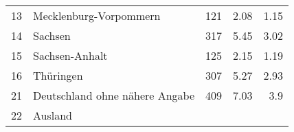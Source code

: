 \begin{longtable}{lXrrr}
     13 &
     \multicolumn{1}{X}{ Mecklenburg-Vorpommern   } &


       \num{121} &
       \num[round-mode=places,round-precision=2]{2,08} &
         \num[round-mode=places,round-precision=2]{1,15} \\

     14 &
     \multicolumn{1}{X}{ Sachsen   } &


       \num{317} &
       \num[round-mode=places,round-precision=2]{5,45} &
         \num[round-mode=places,round-precision=2]{3,02} \\

     15 &
     \multicolumn{1}{X}{ Sachsen-Anhalt   } &


       \num{125} &
       \num[round-mode=places,round-precision=2]{2,15} &
         \num[round-mode=places,round-precision=2]{1,19} \\

     16 &
     \multicolumn{1}{X}{ Thüringen   } &


       \num{307} &
       \num[round-mode=places,round-precision=2]{5,27} &
         \num[round-mode=places,round-precision=2]{2,93} \\

     21 &
     \multicolumn{1}{X}{ Deutschland ohne nähere Angabe   } &


       \num{409} &
       \num[round-mode=places,round-precision=2]{7,03} &
         \num[round-mode=places,round-precision=2]{3,9} \\

     22 &
     \multicolumn{1}{X}{ Ausland   } &



\end{longtable}
